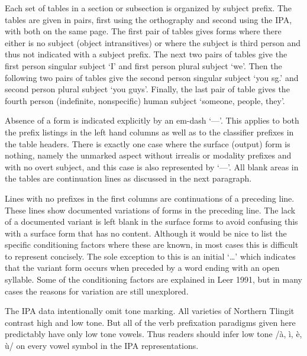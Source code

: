 \documentclass[12pt,letterpaper,landscape,oneside,article]{memoir}
\begin{document}
\begin{multicols}{2}
Each set of tables in a section or subsection is organized by subject prefix.
The tables are given in pairs, first using the orthography and second using the IPA, with both on the same page.
The first pair of tables gives forms where there either is no subject (object intransitives) or where the subject is third person and thus not indicated with a subject prefix.
The next two pairs of tables give the first person singular subject  ‘I’ and first person plural subject  ‘we’.
Then the following two pairs of tables give the second person singular subject  ‘you sg.’ and second person plural subject  ‘you guys’.
Finally, the last pair of table gives the fourth person (indefinite, nonspecific) human subject  ‘someone, people, they’.

Absence of a form is indicated explicitly by an em-dash ‘—’.
This applies to both the prefix listings in the left hand columns as well as to the classifier prefixes in the table headers.
There is exactly one case where the surface (output) form is nothing, namely the unmarked aspect without irrealis or modality prefixes and with no overt subject, and this case is also represented by ‘—’.
All blank areas in the tables are continuation lines as discussed in the next paragraph.

Lines with no prefixes in the first columns are continuations of a preceding line.
These lines show documented variations of forms in the preceding line.
The lack of a documented variant is left blank in the surface forms to avoid confusing this with a surface form that has no content.
Although it would be nice to list the specific conditioning factors where these are known, in most cases this is difficult to represent concisely.
The sole exception to this is an initial ‘…’ which indicates that the variant form occurs when preceded by a word ending with an open syllable.
Some of the conditioning factors are explained in Leer 1991, but in many cases the reasons for variation are still unexplored.




The IPA data intentionally omit tone marking.
All varieties of Northern Tlingit contrast high and low tone.
But all of the verb prefixation paradigms given here predictably have only low tone vowels.
Thus readers should infer low tone /à, ì, è, ù/ on every vowel symbol in the IPA representations.


\end{multicols}
\end{document}
